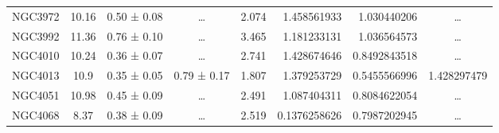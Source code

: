 \documentclass[reprint,%
 amsmath,amssymb,
 aps,
]{revtex4-1}
\begin{document}
\begin{table}[]
\begin{tabular}{cccccrrc}
\rowcolor[HTML]{F3F3F3} 
NGC3972              & 10.16                     & 0.50 ± 0.08           & …                      & 2.074                                                        & 1.458561933                                                           & 1.030440206                                                           & …                                                             \\
\rowcolor[HTML]{F3F3F3} 
NGC3992              & 11.36                     & 0.76 ± 0.10           & …                      & 3.465                                                        & 1.181233131                                                           & 1.036564573                                                           & …                                                             \\
\rowcolor[HTML]{F3F3F3} 
NGC4010              & 10.24                     & 0.36 ± 0.07           & …                      & 2.741                                                        & 1.428674646                                                           & 0.8492843518                                                          & …                                                             \\
\rowcolor[HTML]{F3F3F3} 
NGC4013              & 10.9                      & 0.35 ± 0.05           & 0.79 ± 0.17            & 1.807                                                        & 1.379253729                                                           & 0.5455566996                                                          & \multicolumn{1}{r}{\cellcolor[HTML]{F3F3F3}1.428297479}       \\
\rowcolor[HTML]{F3F3F3} 
NGC4051              & 10.98                     & 0.45 ± 0.09           & …                      & 2.491                                                        & 1.087404311                                                           & 0.8084622054                                                          & …                                                             \\
\rowcolor[HTML]{F3F3F3} 
NGC4068              & 8.37                      & 0.38 ± 0.09           & …                      & 2.519                                                        & 0.1376258626                                                          & 0.7987202945                                                          & …                                                             \\

\end{tabular}
\end{table}
\end{document}
